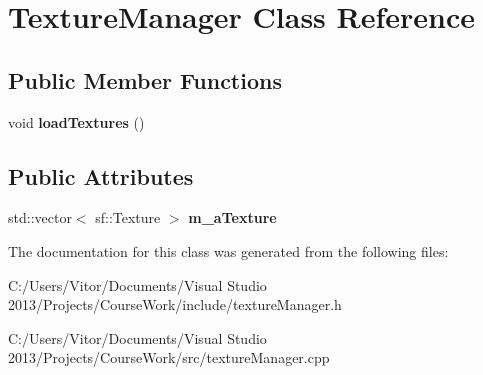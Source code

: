 \hypertarget{class_texture_manager}{}\section{Texture\+Manager Class Reference}
\label{class_texture_manager}
\subsection*{Public Member Functions}
\begin{DoxyCompactItemize}
\item 
\hypertarget{class_texture_manager_a859dd5bc435ebd53938e7c966f85e69b}{}void {\bfseries load\+Textures} ()\label{class_texture_manager_a859dd5bc435ebd53938e7c966f85e69b}

\end{DoxyCompactItemize}
\subsection*{Public Attributes}
\begin{DoxyCompactItemize}
\item 
\hypertarget{class_texture_manager_a8b9ef15786994b25c0640318c6294f3f}{}std\+::vector$<$ sf\+::\+Texture $>$ {\bfseries m\+\_\+a\+Texture}\label{class_texture_manager_a8b9ef15786994b25c0640318c6294f3f}

\end{DoxyCompactItemize}


The documentation for this class was generated from the following files\+:\begin{DoxyCompactItemize}
\item 
C\+:/\+Users/\+Vitor/\+Documents/\+Visual Studio 2013/\+Projects/\+Course\+Work/include/texture\+Manager.\+h\item 
C\+:/\+Users/\+Vitor/\+Documents/\+Visual Studio 2013/\+Projects/\+Course\+Work/src/texture\+Manager.\+cpp\end{DoxyCompactItemize}
